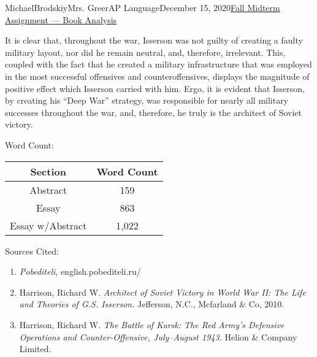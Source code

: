 \documentclass[12pt,letterpaper]{article}
\begin{document}
\begin{mla}{Michael}{Brodskiy}{Mrs. Greer}{AP Language}{December 15, 2020}{\underline{Fall Midterm Assignment — Book Analysis}}
  \begin{justify}
    \vspace{-12pt}\quad It is clear that, throughout the war, Isserson was not guilty of creating a faulty military layout, nor did he remain neutral, and, therefore, irrelevant. This, coupled with the fact that he created a military infrastructure that was employed in the most successful offensives and counteroffensives, displays the magnitude of positive effect which Isserson carried with him. Ergo, it is evident that Isserson, by creating his “Deep War” strategy, was responsible for nearly all military successes throughout the war, and, therefore, he truly is the architect of Soviet victory. 
  \end{justify}

  \begin{center}
    Word Count:\\\vspace{10pt}
    \begin{tabular}{| c | c |}
      \hline
      Section & Word Count\\
      \hline
      Abstract & 159\\
      \hline
      Essay & 863 \\
      \hline
      Essay w/Abstract & 1,022\\
     \hline
    \end{tabular}
  \end{center}

  \newpage

  \begin{center}
    Sources Cited:
  \end{center}

  \begin{enumerate}

    \item \textit{Pobediteli}, english.pobediteli.ru/

    \item Harrison, Richard W.\hspace{5pt} \textit{Architect of Soviet Victory in World War II: The Life and Theories of G.S. Isserson.} Jefferson, N.C., Mcfarland \& Co, 2010.

    \item Harrison, Richard W.\hspace{5pt} \textit{The Battle of Kursk: The Red Army's Defensive Operations and Counter-Offensive, July–August 1943.} Helion \& Company Limited.

  \end{enumerate}

\end{mla}
\end{document}
